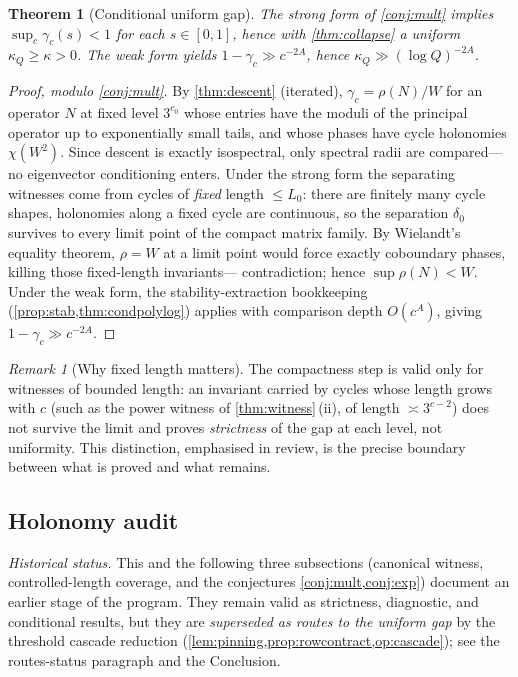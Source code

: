 \documentclass[11pt]{article}
\theoremstyle{plain}
\newtheorem{theorem}{Theorem}
\theoremstyle{definition}
\theoremstyle{remark}
\newtheorem*{remark}{Remark}
\begin{document}
\begin{theorem}[Conditional uniform gap]\label{thm:condunif}
The strong form of \cref{conj:mult} implies $\sup_c\gamma_c(s)<1$ for each
$s\in[0,1]$, hence with \cref{thm:collapse} a uniform $\kappa_Q\ge\kappa>0$.
The weak form yields $1-\gamma_c\gg c^{-2A}$, hence
$\kappa_Q\gg(\log Q)^{-2A}$.
\end{theorem}
\begin{proof}[Proof, modulo \cref{conj:mult}]
By \cref{thm:descent} (iterated), $\gamma_c=\rho(N)/W$ for an operator $N$ at
fixed level $3^{c_0}$ whose entries have the moduli of the principal operator up
to exponentially small tails, and whose phases have cycle holonomies
$\chi(W^2)$. Since descent is exactly isospectral, only spectral radii are
compared---no eigenvector conditioning enters. Under the strong form the
separating witnesses come from cycles of \emph{fixed} length $\le L_0$: there
are finitely many cycle shapes, holonomies along a fixed cycle are continuous,
so the separation $\delta_0$ survives to every limit point of the compact
matrix family. By Wielandt's equality theorem, $\rho=W$ at a limit point would
force exactly coboundary phases, killing those fixed-length invariants---%
contradiction; hence $\sup\rho(N)<W$. Under the weak form, the
stability-extraction bookkeeping (\cref{prop:stab,thm:condpolylog}) applies
with comparison depth $O(c^A)$, giving $1-\gamma_c\gg c^{-2A}$.
\end{proof}

\begin{remark}[Why fixed length matters]
The compactness step is valid only for witnesses of bounded length: an
invariant carried by cycles whose length grows with $c$ (such as the power
witness of \cref{thm:witness}\,(ii), of length $\asymp3^{c-2}$) does not survive
the limit and proves \emph{strictness} of the gap at each level, not
uniformity. This distinction, emphasised in review, is the precise boundary
between what is proved and what remains.
\end{remark}

\subsection*{Holonomy audit}

\emph{Historical status.} This and the following three subsections
(canonical witness, controlled-length coverage, and the conjectures
\cref{conj:mult,conj:exp}) document an earlier stage of the program. They
remain valid as strictness, diagnostic, and conditional results, but they
are \emph{superseded as routes to the uniform gap} by the threshold
cascade reduction (\cref{lem:pinning,prop:rowcontract,op:cascade}); see
the routes-status paragraph and the Conclusion.
\end{document}
